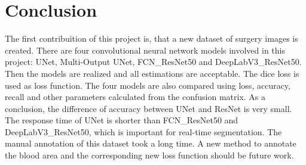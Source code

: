\documentclass[10pt,journal,compsoc]{IEEEtran}
\begin{document}


\section{Conclusion}
The first contribuition of this project is, that a new dataset of surgery images is created.
There are four convolutional \linebreak neural network models involved in this project: UNet, Multi-Output UNet, FCN\_ResNet50 and DeepLabV3\_ResNet50.
Then the models are realized and all estimations are acceptable. 
The dice loss is used as loss function.
The four models are also compared using loss, accuracy, recall and other parameters calculated from the confusion matrix.
As a conclusion, the difference of accuracy between UNet and ResNet is very small. The response time of UNet is shorter than FCN\_ResNet50 and DeepLabV3\_ResNet50, which is important for real-time segmentation.
The manual annotation of this dataset took a long time. 
A new method to annotate the blood area and the corresponding new loss function should be future work.



%
\end{document}
